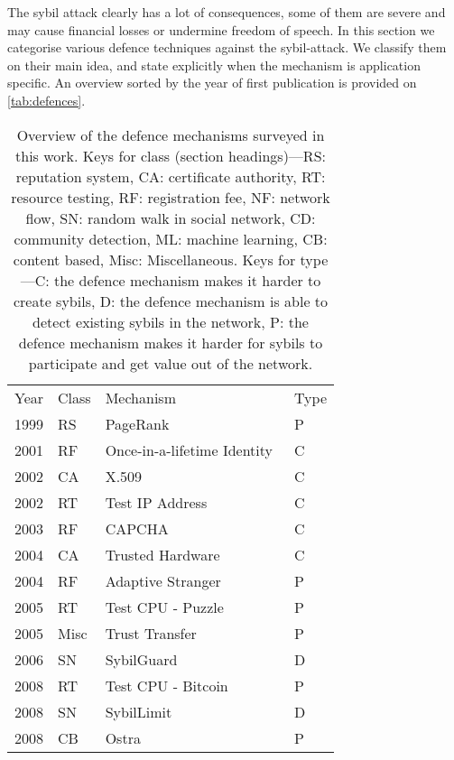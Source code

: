 The sybil attack clearly has a lot of consequences, some of them are severe and
may cause financial losses or undermine freedom of speech. In this section we
categorise various defence techniques against the sybil-attack. We classify them
on their main idea, and state explicitly when the mechanism is application
specific. An overview sorted by the year of first publication is provided on
\autoref{tab:defences}.

\begin{table}[]
\centering
\caption{Overview of the defence mechanisms surveyed in this work. Keys for
  class (section headings)---RS: reputation system, CA: certificate authority,
  RT: resource testing, RF: registration fee, NF: network flow, SN: random walk
  in social network, CD: community detection, ML: machine learning, CB: content
  based, Misc: Miscellaneous. Keys for type---C: the defence mechanism makes it
  harder to create sybils, D: the defence mechanism is able to detect existing
  sybils in the network, P: the defence mechanism makes it harder for sybils to
  participate and get value out of the network.}
\label{tab:defences}
\begin{tabular}{llll}
  Year & Class & Mechanism & Type \\
  1999 & RS &  PageRank~\cite{page1999pagerank} & P  \\
  2001 & RF & Once-in-a-lifetime Identity~\cite{resnick2001social} & C  \\
  2002 & CA &  X.509~\cite{housley2002internet} & C  \\
  2002 & RT & Test IP Address~\cite{freedman2002tarzan} & C  \\
  2003 & RF & CAPCHA~\cite{von2003captcha} & C  \\
  2004 & CA &  Trusted Hardware~\cite{newsome2004sybil} & C  \\
  2004 & RF & Adaptive Stranger~\cite{feldman2004robust} & P  \\
  2005 & RT &  Test CPU - Puzzle~\cite{aspnes2005exposing} & P \\
  2005 & Misc & Trust Transfer~\cite{seigneur2005trust} & P  \\
  2006 & SN & SybilGuard~\cite{yu2006sybilguard} & D  \\
  2008 & RT &  Test CPU - Bitcoin~\cite{nakamoto2008bitcoin} & P \\
  2008 & SN & SybilLimit~\cite{yu2008sybillimit} & D  \\
  2008 & CB & Ostra~\cite{mislove2008ostra} & P  \\

\end{tabular}
\end{table}
